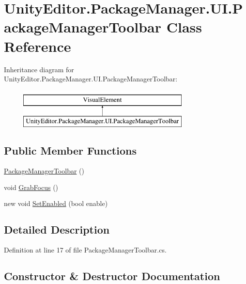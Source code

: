 \hypertarget{class_unity_editor_1_1_package_manager_1_1_u_i_1_1_package_manager_toolbar}{}\section{Unity\+Editor.\+Package\+Manager.\+U\+I.\+Package\+Manager\+Toolbar Class Reference}
\label{class_unity_editor_1_1_package_manager_1_1_u_i_1_1_package_manager_toolbar}
Inheritance diagram for Unity\+Editor.\+Package\+Manager.\+U\+I.\+Package\+Manager\+Toolbar\+:\begin{figure}[H]
\begin{center}
\leavevmode
\includegraphics[height=2.000000cm]{class_unity_editor_1_1_package_manager_1_1_u_i_1_1_package_manager_toolbar}
\end{center}
\end{figure}
\subsection*{Public Member Functions}
\begin{DoxyCompactItemize}
\item 
\mbox{\hyperlink{class_unity_editor_1_1_package_manager_1_1_u_i_1_1_package_manager_toolbar_ab4147552e82feeb6c87950e5d8783e28}{Package\+Manager\+Toolbar}} ()
\item 
void \mbox{\hyperlink{class_unity_editor_1_1_package_manager_1_1_u_i_1_1_package_manager_toolbar_a16dbbf25eadbd9c2f45d017a7e64a94b}{Grab\+Focus}} ()
\item 
new void \mbox{\hyperlink{class_unity_editor_1_1_package_manager_1_1_u_i_1_1_package_manager_toolbar_a304fa7054b0176b712cc00e20253ec49}{Set\+Enabled}} (bool enable)
\end{DoxyCompactItemize}


\subsection{Detailed Description}


Definition at line 17 of file Package\+Manager\+Toolbar.\+cs.



\subsection{Constructor \& Destructor Documentation}
\mbox{\label{class_unity_editor_1_1_package_manager_1_1_u_i_1_1_package_manager_toolbar_ab4147552e82feeb6c87950e5d8783e28}} 
